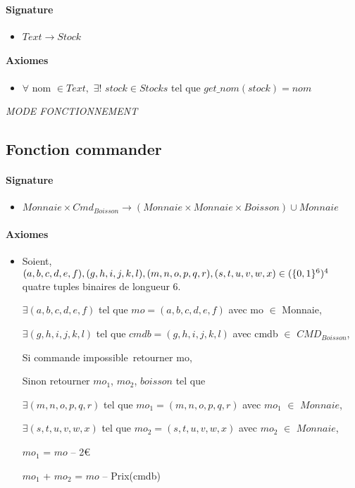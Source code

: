 \documentclass[]{article}
\newcommand{\euro}{€}
\begin{document}
\paragraph{Signature}
\begin{itemize}
\item
  $Text \longrightarrow  Stock$
\end{itemize}
\paragraph{Axiomes}
\begin{itemize}
\item
   $\forall$ nom $\in Text,$ $\exists!$ $stock \in Stocks$ tel que $get\_nom(stock) = nom$

\end{itemize}

\pagebreak
\emph{MODE FONCTIONNEMENT}~

\subsection*{Fonction commander}
\paragraph{Signature}
\begin{itemize}
\item
  $Monnaie \times Cmd_{Boisson} \rightarrow  (Monnaie \times Monnaie \times Boisson) \cup Monnaie$
\end{itemize}
\paragraph{Axiomes}
\begin{itemize}
\item
  Soient, \\ $(a,b,c,d,e,f), (g,h,i,j,k,l), (m,n,o,p,q,r), (s,t,u,v,w,x)
 \in(\{0,1\}\textsuperscript{6})\textsuperscript{4}$ \\quatre tuples binaires de longueur 6.

$\exists (a,b,c,d,e,f)$ tel que $mo = (a,b,c,d,e,f)$ avec mo $\in$ Monnaie,

$\exists (g,h,i,j,k,l)$ tel que $cmdb =(g,h,i,j,k,l)$ avec cmdb $\in$ $CMD_{Boisson}$,

Si commande impossible~retourner mo,

Sinon retourner $mo_1$, $ mo_2$, $boisson$ tel que

$\exists(m,n,o,p,q,r)$ tel que $mo_1 =(m,n,o,p,q,r)$ avec $mo_1$ $\in$ $Monnaie$,

$\exists  (s,t,u,v,w,x)$ tel que $mo_2 = (s,t,u,v,w,x)$ avec $mo_2$ $\in$ $Monnaie$,

$mo_1$ = $ mo$ -- 2\euro{}

$mo_1$ + $ mo_2 $ = $ mo$ -- Prix(cmdb)

\end{itemize}
\end{document}
